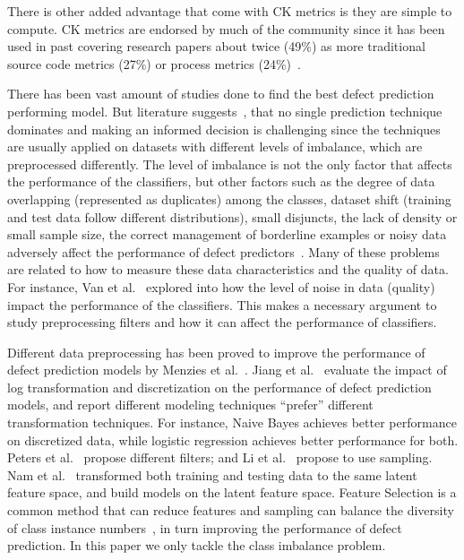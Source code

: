 \documentclass[10pt,conference]{IEEEtran}
\theoremstyle{break}
\theoremstyle{break}
\begin{document}
There is other added advantage that come with CK metrics is they are  simple  to  compute. CK metrics are endorsed by much of the community since it has been used in past covering research papers about twice (49\%) 
as more traditional source code metrics (27\%) or process metrics (24\%)~\cite{radjenovic2013software}. 

There has been vast amount of studies done to find the best defect prediction performing model. But literature suggests~\cite{lessmann2008benchmarking, ghotra2015revisiting}, that no single prediction technique dominates and making an informed decision is challenging since the techniques are usually applied on datasets with different levels of imbalance, which are preprocessed differently. 
The level of imbalance is not the only factor that affects
the performance of the classifiers, but other factors
such as the degree of data overlapping (represented
as duplicates) among the classes, dataset shift (training and test
data follow different distributions), small disjuncts, the lack of density
or small sample size, the
correct management of borderline examples or noisy
data adversely affect the performance of defect predictors~\cite{lopez2014importance,lopez2012analysis}. Many of these problems are related to how to
measure these data characteristics and the quality of
data. For instance, Van et al.~\cite{van2009knowledge}
explored into how the level of noise in data (quality) impact the performance of the classifiers. This makes a necessary argument to study preprocessing filters and how it can affect the performance of classifiers. 

Different data preprocessing has been proved
to improve the performance of defect prediction models by
Menzies et al.~\cite{menzies2007data}. Jiang et al.~\cite{jiang2008can} evaluate the impact of
log transformation and discretization on the performance
of defect prediction models, and report different modeling
techniques ``prefer'' different transformation techniques. For
instance, Naive Bayes achieves better performance on discretized
data, while logistic regression achieves better performance
for both. Peters et al.~\cite{peters2013better} propose different filters; and Li et al.~\cite{li2012sample} propose
to use sampling. Nam et al.~\cite{nam2013transfer} transformed both
training and testing data to the same latent feature space,
and build models on the latent feature space. 
Feature Selection is a common method that can
reduce features and sampling can balance the diversity of
class instance numbers~\cite{yin2015empirical}, in turn improving the performance of defect prediction. In this paper we only tackle the class imbalance problem.
\end{document}
